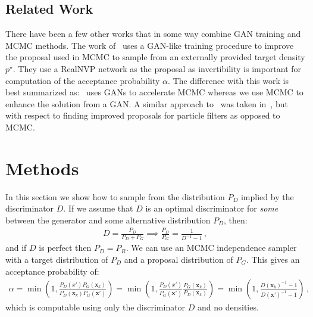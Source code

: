 \documentclass{article}
\renewcommand{\vec}[1]{{\boldsymbol{\mathbf{#1}}}} %
\newcommand{\target}{{p^\star}}
\begin{document}
\subsection{Related Work}

There have been a few other works that in some way combine GAN training and MCMC methods.
The work of~\citet{} uses a GAN-like training procedure to improve the proposal used in MCMC to sample from an externally provided target density $\target$.
They use a RealNVP network as the proposal as invertibility is important for computation of the acceptance probability $\alpha$.
The difference with this work is best summarized as:~\citet{} uses GANs to accelerate MCMC whereas we use MCMC to enhance the solution from a GAN\@.
A similar approach to~\citet{} was taken in~\citet{}, but with respect to finding improved proposals for particle filters as opposed to MCMC\@.

\section{Methods}

In this section we show how to sample from the distribution $P_D$ implied by the discriminator $D$.
If we assume that $D$ is an optimal discriminator for \emph{some} between the generator and some alternative distribution $P_D$, then:
\begin{align}
  D = \frac{P_D}{P_D + P_G} \implies \frac{P_D}{P_G} = \frac{1}{D^{-1}-1}\,, \label{eq:PD def}
\end{align}
and if $D$ is perfect then $P_D = P_R$.
We can use an MCMC independence sampler with a target distribution of $P_D$ and a proposal distribution of $P_G$.
This gives an acceptance probability of:
\begin{align}
  \alpha = \min\left(1, \frac{P_D(x')P_G(\vec x_k)}{P_D(\vec x_k)P_G(\vec x')}\right)
    = \min\left(1, \frac{P_D(x')}{P_G(\vec x')} \frac{P_G(\vec x_k)}{P_D(\vec x_k)}\right)
    = \min\left(1, \frac{D(\vec x_k)^{-1} - 1}{D(\vec x')^{-1} - 1}\right)\,, \label{eq:alpha from D}
\end{align}
which is computable using only the discriminator $D$ and no densities.
\end{document}
